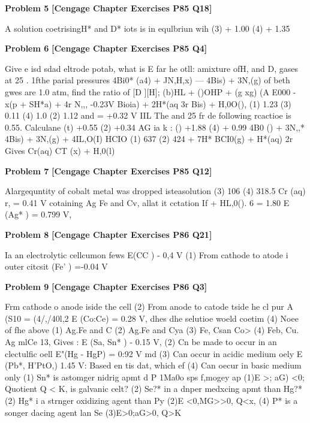 \begin{problembox}
\textbf{Problem 5} \hfill \textbf{[Cengage Chapter Exercises P85 Q18]}
\label{q:ext-cng-th-5}

A solution coetrisingH* and D* iots is in equlbriun wih
(3) + 1.00
(4) + 1.35
\end{problembox}

\begin{problembox}
\textbf{Problem 6} \hfill \textbf{[Cengage Chapter Exercises P85 Q4]}
\label{q:ext-cng-th-6}

Give e isd sdad eltrode potab, what is E
far he otll:
amixture ofH, and D, gases at 25 . 1fthe parial pressures
4Bi0* (a4) + JN,H,x) ---  4Bis) + 3N,(g)
of beth gwes are 1.0 atm, find the ratio of [D ][H];
(b)HL + ()OHP +
(g  xg)
(A E000 -
x(p + SH*a) + 4r   N,,, -0.23V
Bioia) + 2H*(aq 3r   Bis) + H,0O(),
(1) 1.23
(3) 0.11
(4) 1.0
(2) 1.12
 and   = +0.32 V
IIL The  and   25  fr de following rcactioe is 0.55. Calculane
(t) +0.55
(2) +0.34
AG  ia k  :
() +1.88
(4) + 0.99
4B0 () + 3N,,*  4Bis) + 3N,(g) + 4IL,O(I)
HCIO
(1) 637
(2) 424
+ 7H*
BCI0(g) + H*(aq) 2r 
Gives Cr(aq)
  CT (x) + H,0(l)
\end{problembox}

\begin{problembox}
\textbf{Problem 7} \hfill \textbf{[Cengage Chapter Exercises P85 Q12]}
\label{q:ext-cng-th-7}

Alargequntity of cobalt metal was dropped isteasolution
(3) 106
(4) 318.5
  Cr (aq) r,   = 0.41 V
cotaining Ag Fe and Cv, allat it cctation If
+ HL,0(). 6  = 1.80
E  (Ag* ) = 0.799 V,
\end{problembox}

\begin{problembox}
\textbf{Problem 8} \hfill \textbf{[Cengage Chapter Exercises P86 Q21]}
\label{q:ext-cng-th-8}

Ia an electrolytic cellcumon fews
E(CC ) - 0,4 V
(1) From cathode to atode i outer citcsit
 (Fe' ) =-0.04 V
\end{problembox}

\begin{problembox}
\textbf{Problem 9} \hfill \textbf{[Cengage Chapter Exercises P86 Q3]}
\label{q:ext-cng-th-9}

Frm cathode o anode iside the cell
(2) From anode to catode tside he cl
pur A (S10 = (4/,/40l,2
E (Co:Ce) = 0.28 V, dhes dhe selutioe woeld coetim
(4) Noee of fhe above
(1) Ag.Fe and C
(2) Ag.Fe and Cya
(3) Fe, Csan Co>
(4) Feb, Cu. Ag mlCe
13, Gives : E (Sa, Sn* ) - 0.15 V,
(2) Cn be made to occur in an clectulfic oell
E"(Hg  - HgP) = 0:92 V md
(3) Can occur in acidic medium oely
E (Pb*, H'PtO,)  1.45 V: Based en tis dat, which ef
(4) Can oecur in basic medium only
(1) Sn* is astomger nidrig apmt d P
 1Ma0o  sps f,mogey ap
(1)E >; aG) <0; Quotient Q < K,
is galvanic celt?
(2) Se?* in a dnper medxcing apmt than Hg?*
(2) Hg* i a strnger oxidizing agent than Py
(2)E <0,MG>>0, Q<x,
(4) P* is a songer dacing agent lan Se
(3)E>0;aG>0, Q>K
\end{problembox}

